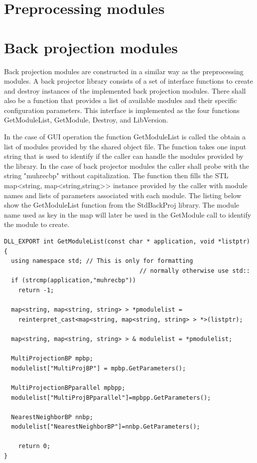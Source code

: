 \documentclass[11pt,a4paper]{article}
\begin{document}
\section{Preprocessing modules}
\section{Back projection modules}
Back projection modules are constructed in a similar way as the preprocessing modules. A back projector library consists of a set of interface functions to create and destroy instances of the implemented back projection modules. There shall also be a function that provides a list of available modules and their specific configuration parameters. This interface is implemented as the four functions
 GetModuleList, GetModule, Destroy, and LibVersion.

\lstset{language=C++ %
}

In the case of GUI operation the function GetModuleList is called the obtain a list of modules provided by the shared object file. The function takes one input string that is used to identify if the caller can handle the modules provided by the library. In the case of back projector modules the caller shall probe with the string "muhrecbp" without capitalization. The function then fills the STL map<string, map<string,string>> instance provided by the caller with module names and lists of parameters associated with each module. The listing below show the GetModuleList function from the StdBackProj library. The module name used as key in the map will later be used in the GetModule call to identify the module to create.
\begin{lstlisting}
DLL_EXPORT int GetModuleList(const char * application, void *listptr)
{
  using namespace std; // This is only for formatting 
                                      // normally otherwise use std::
  if (strcmp(application,"muhrecbp"))
    return -1;

  map<string, map<string, string> > *pmodulelist =
    reinterpret_cast<map<string, map<string, string> > *>(listptr);

  map<string, map<string, string> > & modulelist = *pmodulelist;

  MultiProjectionBP mpbp;
  modulelist["MultiProjBP"] = mpbp.GetParameters();

  MultiProjectionBPparallel mpbpp; 
  modulelist["MultiProjBPparallel"]=mpbpp.GetParameters();

  NearestNeighborBP nnbp;
  modulelist["NearestNeighborBP"]=nnbp.GetParameters();

	return 0;
}
\end{lstlisting}
\end{document}
